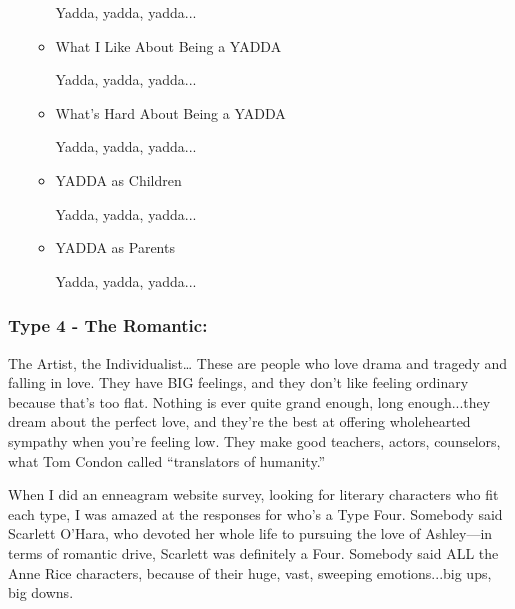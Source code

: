 \documentclass[openleft,oneside,showtrims]{memoir}
\begin{document}
\begin{itemize}
\begin{itemize}
Yadda, yadda, yadda...

\item What I Like About Being a YADDA
\label{sec:orgacc36be}

Yadda, yadda, yadda...

\item What's Hard About Being a YADDA
\label{sec:orgfc3af66}

Yadda, yadda, yadda...

\item YADDA as Children
\label{sec:org59d4566}

Yadda, yadda, yadda...

\item YADDA as Parents
\label{sec:orgb69907a}

Yadda, yadda, yadda...
\end{itemize}
\end{itemize}

\subsubsection*{Type 4 - The Romantic:}
\label{sec:org7894b1f}

The Artist, the Individualist… These are people who love drama and tragedy and falling in love. They have BIG feelings, and they don't like feeling ordinary because that's too flat. Nothing is ever quite grand enough, long enough...they dream about the perfect love, and they're the best at offering wholehearted sympathy when you're feeling low. They make good teachers, actors, counselors, what Tom Condon called ``translators of humanity.''

When I did an enneagram website survey, looking for literary characters who fit each type, I was amazed at the responses for who's a Type Four. Somebody said Scarlett O'Hara, who devoted her whole life to pursuing the love of Ashley—in terms of romantic drive, Scarlett was definitely a Four. Somebody said ALL the Anne Rice characters, because of their huge, vast, sweeping emotions...big ups, big downs.
\end{document}
